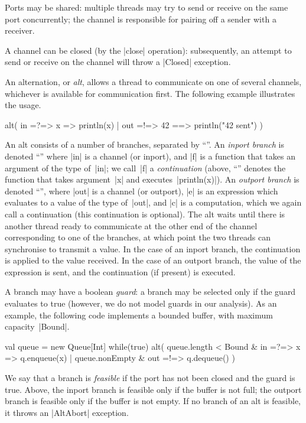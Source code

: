 Ports may be shared: multiple threads may try to send or receive on the same
port concurrently; the channel is responsible for pairing off a sender with a
receiver. 

A channel can be closed (by the |close| operation): subsequently, an attempt
to send or receive on the channel will throw a |Closed| exception.

An alternation, or \emph{alt}, allows a thread to communicate on one of
several channels, whichever is available for communication first.  The
following example illustrates the usage.
%
\begin{scala}
alt(
  in =?=> { x => println(x) }
  | out =!=> { 42 } ==> { println("42 sent") }
)
\end{scala}
%
An alt consists of a number of branches, separated by ``\SCALA{\|}''.  An
\emph{inport branch} is denoted ``'' where |in| is a channel
(or inport), and |f| is a function that takes an argument of the type of~|in|;
we call~|f| a \emph{continuation} (above, ``'' denotes
the function that takes argument~|x| and executes~|println(x)|).  An
\emph{outport branch} is denoted ``'', where |out|
is a channel (or outport), |e| is an expression which evaluates to a value of
the type of~|out|, and |c| is a computation, which we again call a
continuation (this continuation is optional).  The alt waits until there is
another thread ready to communicate at the other end of the channel
corresponding to one of the branches, at which point the two threads can
synchronise to transmit a value.  In the case of an inport branch, the
continuation is applied to the value received.  In the case of an outport
branch, the value of the expression is sent, and the continuation (if present)
is executed.

A branch may have a boolean \emph{guard}: a branch may be selected only if the
guard evaluates to true (however, we do not model guards in our analysis).  As
an example, the following code implements a bounded buffer, with maximum
capacity~|Bound|.
%
\begin{scala}
val queue = new Queue[Int]
while(true){
  alt(
    queue.length < Bound & in =?=> { x => q.enqueue(x) }
    | queue.nonEmpty & out =!=> { q.dequeue() }
  )    
}
\end{scala}
%
We say that a branch is \emph{feasible} if the port has not been closed and
the guard is true.  Above, the inport branch is feasible only if the buffer is
not full; the outport branch is feasible only if the buffer is not empty.  If
no branch of an alt is feasible, it throws an |AltAbort| exception. 

